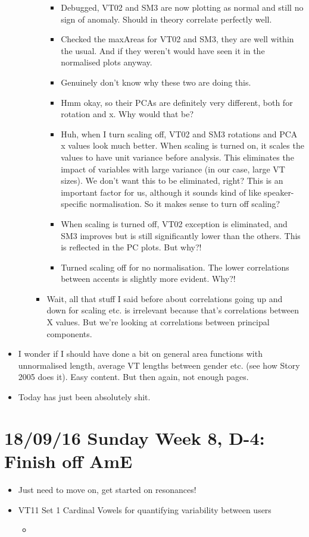 \documentclass{article}
\begin{document}
\begin{itemize}
\begin{itemize}
\begin{itemize}
\begin{itemize}
\begin{verbatim}
                \end{verbatim}
                \item Debugged, VT02 and SM3 are now plotting as normal and still no sign of anomaly. Should in theory correlate perfectly well.
                \item Checked the maxAreas for VT02 and SM3, they are well within the usual. And if they weren't would have seen it in the normalised plots anyway.
                \item Genuinely don't know why these two are doing this.
                \item Hmm okay, so their PCAs are definitely very different, both for rotation and x. Why would that be?
                \item Huh, when I turn scaling off, VT02 and SM3 rotations and PCA x values look much better. When scaling is turned on, it scales the values to have unit variance before analysis. This eliminates the impact of variables with large variance (in our case, large VT sizes). We don't want this to be eliminated, right? This is an important factor for us, although it sounds kind of like speaker-specific normalisation. So it makes sense to turn off scaling?
                \item When scaling is turned off, VT02 exception is eliminated, and SM3 improves but is still significantly lower than the others. This is reflected in the PC plots. But why?!
                \item Turned scaling off for no normalisation. The lower correlations between accents is slightly more evident. Why?!
            \end{itemize}
            \item Wait, all that stuff I said before about correlations going up and down for scaling etc. is irrelevant because that's correlations between X values. But we're looking at correlations between principal components.
        \end{itemize}
    \end{itemize}
    \item I wonder if I should have done a bit on general area functions with unnormalised length, average VT lengths between gender etc. (see how Story 2005 does it). Easy content. But then again, not enough pages.
    \item Today has just been absolutely shit.
\end{itemize}

\section*{18/09/16 Sunday Week 8, D-4: Finish off AmE}
\begin{itemize}
    \item Just need to move on, get started on resonances!
    \item VT11 Set 1 Cardinal Vowels for quantifying variability between users
    \begin{itemize}
        \item 
    \end{itemize}    
\end{itemize}
\end{document}
